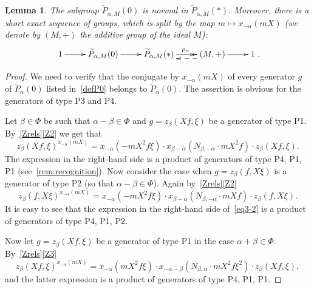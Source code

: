 \documentclass[oneside, 8pt]{amsart}
\newtheorem{lemma}{Lemma}
\theoremstyle{remark}
\theoremstyle{definition}
\numberwithin{lemma}{section}
\numberwithin{prop}{section}
\numberwithin{corollary}{section}
\numberwithin{externaltheorem}{section}
\numberwithin{equation}{section}
\begin{document}
\begin{lemma}\label{P0_normal} The subgroup $\widetilde{P}_{\alpha, M}(0)$ is normal in $\widetilde{P}_{\alpha, M}(*)$. Moreover, there is a short exact sequence of groups, which is split by the map $m \mapsto x_{-\alpha}(mX)$ (we denote by $(M, +)$ the additive group of the ideal $M$):
\[\xymatrix{1 \ar[r] & \widetilde{P}_{\alpha,M}(0) \ar[r] & \widetilde{P}_{\alpha,M}(*) \ar@{->>}[r]^{p_\alpha} & (M, +) \ar@<5pt>@{-->}[l] \ar[r] & 1}.\] \end{lemma}
\begin{proof} We need to verify that the conjugate by $x_{-\alpha}(mX)$ of every generator $g$ of $\widetilde{P}_\alpha(0)$ listed in~\cref{defP0} belongs to $\widetilde{P}_\alpha(0)$.
The assertion is obvious for the generators of type P3 and P4.

Let $\beta\in\Phi$ be such that $\alpha - \beta \in \Phi$ and $g = z_\beta(Xf, \xi)$ be a generator of type P1. By~\cref{Zrels}\eqref{Z2} we get that \begin{equation} z_{\beta}(Xf, \xi) ^ {x_{-\alpha}(mX)} =  x_{-\alpha} (- mX^2f\xi) \cdot x_{\beta-\alpha} (N_{\beta, -\alpha}\cdot mX^2f) \cdot z_{\beta}(Xf, \xi). \label{eq3-1} \end{equation}
The expression in the right-hand side is a product of generators of type P4, P1, P1 (see~\cref{rem:recognition}).
Now consider the case when $g = z_\beta(f, X\xi)$ is a generator of type P2 (so that $\alpha-\beta\in\Phi$). Again by~\cref{Zrels}\eqref{Z2}
\begin{equation}
z_{\beta}(f, X\xi) ^ {x_{-\alpha}(mX)} =  x_{-\alpha} (- mX^2f\xi ) \cdot x_{\beta-\alpha} (N_{\beta, -\alpha}\cdot mXf) \cdot z_{\beta}(f, X\xi). \label{eq3-2} \end{equation}
It is easy to see that the expression in the right-hand side of~\eqref{eq3-2} is a product of generators of type P4, P1, P2.

Now let $g = z_{\beta}(Xf, \xi)$ be a generator of type P1 in the case $\alpha + \beta \in \Phi$. By~\cref{Zrels}\eqref{Z3}
\begin{equation} \label{eq3-3} z_{\beta}(Xf, \xi) ^ {x_{-\alpha}(mX)} = x_{-\alpha} (mX^2f\xi ) \cdot x_{-\alpha-\beta} (N_{\beta,\alpha}\cdot mX^2f\xi^2) \cdot z_{\beta}(Xf, \xi), \end{equation}
and the latter expression is a product of generators of type P4, P1, P1.


\end{proof}
\end{document}
